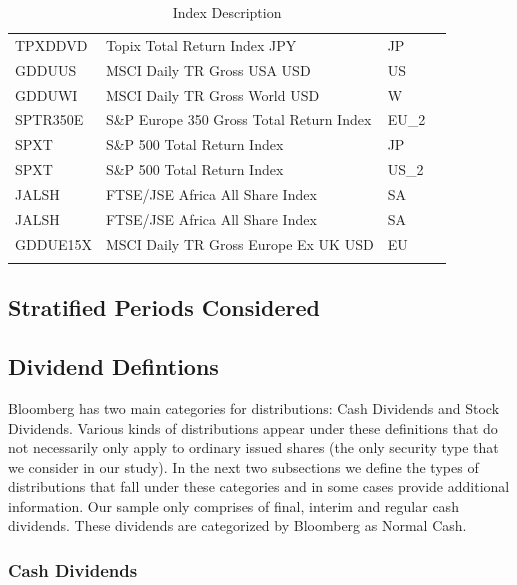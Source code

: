 \documentclass[12pt,preprint, authoryear]{elsarticle}
\numberwithin{equation}{section}
\numberwithin{figure}{section}
\numberwithin{table}{section}
\begin{document}
\begin{longtable}{llll}
  TPXDDVD & Topix Total Return Index JPY & JP &  \\ 
  GDDUUS & MSCI Daily TR Gross USA USD & US &  \\ 
  GDDUWI & MSCI Daily TR Gross World USD & W &  \\ 
  SPTR350E & S\&P Europe 350 Gross Total Return Index & EU\_2 &  \\ 
  SPXT & S\&P 500 Total Return Index & JP &  \\ 
  SPXT & S\&P 500 Total Return Index & US\_2 &  \\ 
  JALSH & FTSE/JSE Africa All Share Index & SA &  \\ 
  JALSH & FTSE/JSE Africa All Share Index & SA &  \\ 
  GDDUE15X & MSCI Daily TR Gross Europe Ex UK USD & EU &  \\ 
   \bottomrule
\caption{Index Description \label{indexdes}} 
\end{longtable}
\endgroup

\hypertarget{stratified-periods-considered}{%
\subsection{Stratified Periods
Considered}\label{stratified-periods-considered}}

\newpage

\hypertarget{dividend-defintions}{%
\subsection{Dividend Defintions}\label{dividend-defintions}}

Bloomberg has two main categories for distributions: Cash Dividends and
Stock Dividends. Various kinds of distributions appear under these
definitions that do not necessarily only apply to ordinary issued shares
(the only security type that we consider in our study). In the next two
subsections we define the types of distributions that fall under these
categories and in some cases provide additional information. Our sample
only comprises of final, interim and regular cash dividends. These
dividends are categorized by Bloomberg as Normal Cash.

\hypertarget{cash-dividends}{%
\subsubsection{Cash Dividends}\label{cash-dividends}}
\end{document}
